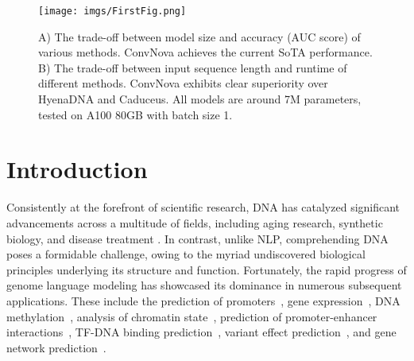 \begin{figure}[h]
    \vspace{-0.5em}
    \centering
    \texttt{[image: imgs/FirstFig.png]}
    \caption{A) The trade-off between model size and accuracy (AUC score) of 
    various 
    methods. ConvNova achieves the current SoTA performance. B) The trade-off between input sequence length and runtime of different methods. ConvNova exhibits clear superiority over HyenaDNA and Caduceus. All models are around 7M parameters, tested on A100 80GB with batch size 1.}
    \label{fig:topresults}
\end{figure}
\section{Introduction}
%
Consistently at the forefront of scientific research, DNA has catalyzed significant advancements across a multitude of fields,
including aging research, synthetic biology, and disease treatment \citep{chucair2024age, moe2013preparing}.
In contrast, 
unlike NLP, comprehending DNA poses a formidable challenge, owing to the myriad undiscovered biological principles underlying its structure and function.
Fortunately, the rapid progress of genome language modeling has showcased its dominance in numerous subsequent applications. These include the prediction of promoters~\citep{zhang2022ipro}, gene expression~\citep{avsec2021effective}, DNA methylation~\citep{jin2022idna}, analysis of chromatin state~\citep{lee2022learning}, prediction of promoter-enhancer interactions~\citep{chen2022capturing}, TF-DNA binding prediction~\citep{wang2022towards}, variant effect prediction~\citep{rozowsky2023tex}, and gene network prediction~\citep{theodoris2023transfer}.

